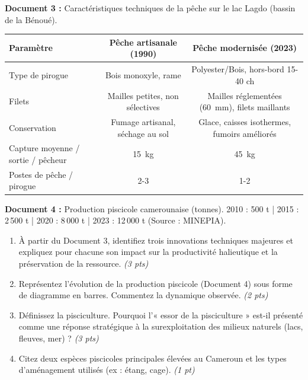 \documentclass[11pt]{article}
\begin{document}
\begin{exercice}
\textbf{Document 3 :} Caractéristiques techniques de la pêche sur le lac Lagdo (bassin de la Bénoué).

\begin{tabular}{lcc}
\toprule
\textbf{Paramètre} & \textbf{Pêche artisanale (1990)} & \textbf{Pêche modernisée (2023)} \\
\midrule
Type de pirogue & Bois monoxyle, rame & Polyester/Bois, hors-bord 15-40 ch \\
Filets & Mailles petites, non sélectives & Mailles réglementées (\SI{60}{\milli\meter}), filets maillants \\
Conservation & Fumage artisanal, séchage au sol & Glace, caisses isothermes, fumoirs améliorés \\
Capture moyenne / sortie / pêcheur & \SI{15}{\kilo\gram} & \SI{45}{\kilo\gram} \\
Postes de pêche / pirogue & 2-3 & 1-2 \\
\bottomrule
\end{tabular}

\textbf{Document 4 :} Production piscicole camerounaise (tonnes).
2010 : 500 t | 2015 : 2\,500 t | 2020 : 8\,000 t | 2023 : 12\,000 t (Source : MINEPIA).

\begin{enumerate}
    \item À partir du Document 3, identifiez trois innovations techniques majeures et expliquez pour chacune son impact sur la productivité halieutique et la préservation de la ressource. \textit{(3 pts)}
    \item Représentez l'évolution de la production piscicole (Document 4) sous forme de diagramme en barres. Commentez la dynamique observée. \textit{(2 pts)}
    \item Définissez la pisciculture. Pourquoi l'« essor de la pisciculture » est-il présenté comme une réponse stratégique à la surexploitation des milieux naturels (lacs, fleuves, mer) ? \textit{(3 pts)}
    \item Citez deux espèces piscicoles principales élevées au Cameroun et les types d'aménagement utilisés (ex : étang, cage). \textit{(1 pt)}
\end{enumerate}
\end{exercice}
\end{document}
